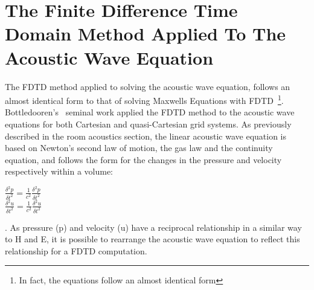 \section{The Finite Difference Time Domain Method Applied To The Acoustic Wave Equation}
The FDTD method applied to solving the acoustic wave equation, follows an almost identical form to that of solving Maxwells Equations with FDTD~\cite{Scheirman2015}\footnote{In fact, the equations follow an almost identical form}. Bottledooren's~\cite{Botteldooren1993} seminal work applied the FDTD method to the acoustic wave equations for both Cartesian and quasi-Cartesian grid systems. As previously described in the room acoustics section, the linear acoustic wave equation is based on Newton's second law of motion, the gas law and the continuity equation, and follows the form for the changes in the pressure and velocity respectively within a volume:\\
\begin{center}
$\frac{\delta^2 p}{\delta t^2} = \frac{1}{c^2} \frac{\delta^2 p}{\delta t^2}$\\
$\frac{\delta^2 u}{\delta t^2} = \frac{1}{c^2} \frac{\delta^2 u}{\delta t^2}$\\
\end{center}.
As pressure (p) and velocity (u) have a reciprocal relationship in a similar way to H and E, it is possible to rearrange the acoustic wave equation to reflect this relationship for a FDTD computation.
